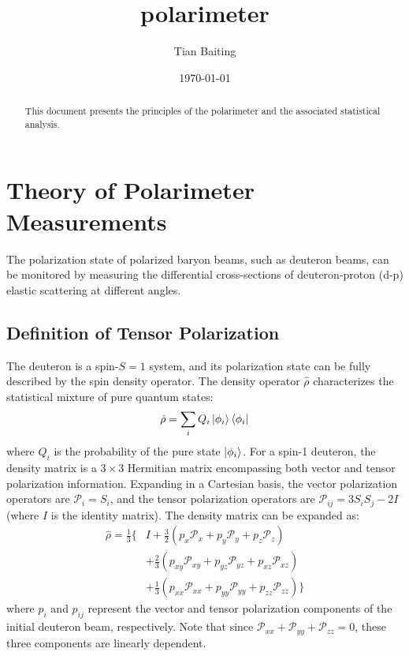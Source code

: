 \documentclass[11pt,a4paper]{article}
\title{polarimeter}
\author{Tian Baiting}
\date{\today}
\begin{document}
\maketitle
\begin{abstract}
This document presents the principles of the polarimeter and the associated statistical analysis.
\end{abstract}

\section{Theory of Polarimeter Measurements}
\label{sec:theory}

The polarization state of polarized baryon beams, such as deuteron beams, can be monitored by measuring the differential cross-sections of deuteron-proton (d-p) elastic scattering at different angles.

\subsection{Definition of Tensor Polarization}

The deuteron is a spin-$S=1$ system, and its polarization state can be fully described by the spin density operator. The density operator $\hat{\rho}$ characterizes the statistical mixture of pure quantum states:
\begin{equation}
\hat{\rho} = \sum_i Q_i \ket{\phi_i}\bra{\phi_i}
\end{equation}
where $Q_i$ is the probability of the pure state $\ket{\phi_i}$. For a spin-1 deuteron, the density matrix is a $3 \times 3$ Hermitian matrix encompassing both vector and tensor polarization information. Expanding in a Cartesian basis, the vector polarization operators are $\mathscr{P}_i = S_i$, and the tensor polarization operators are $\mathscr{P}_{ij}= 3 S_i S_j - 2I$ (where $I$ is the identity matrix). The density matrix can be expanded as:
\begin{equation}
\begin{aligned}
    \hat{\rho} = \frac{1}{3} \Bigg\{ &I + \frac{3}{2} \left( p_x \mathscr{P}_x + p_y \mathscr{P}_y + p_z \mathscr{P}_z \right) \\  
    &+ \frac{2}{3} \left( p_{xy} \mathscr{P}_{xy} + p_{yz} \mathscr{P}_{yz} + p_{xz} \mathscr{P}_{xz} \right) \\ 
    &+ \frac{1}{3} \left( p_{xx} \mathscr{P}_{xx} + p_{yy} \mathscr{P}_{yy} +p_{zz} \mathscr{P}_{zz} \right) \Bigg\}
\end{aligned}
\end{equation}
where $p_i$ and $p_{ij}$ represent the vector and tensor polarization components of the initial deuteron beam, respectively. Note that since $\mathscr{P}_{x x} + \mathscr{P}_{y y} + \mathscr{P}_{z z} = 0$, these three components are linearly dependent.
\end{document}
